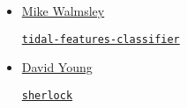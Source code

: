 \documentclass[11pt,a4paper]{article}
\begin{document}
\begin{itemize}
\item \href{https://github.com/mwalmsley/}{Mike Walmsley} 
  \begin{itemize}
    \href{https://github.com/mwalmsley/tidal-features-classifier}{\tt tidal-features-classifier} 
\end{itemize}

\item \href{https://github.com/thespacedoctor}{David Young}
  \begin{itemize}
    \href{https://github.com/thespacedoctor/sherlock}{{\tt sherlock}}
  \end{itemize}




\end{itemize}
\end{document}

